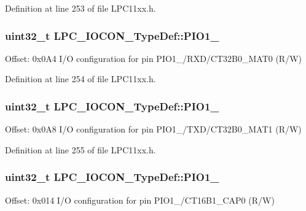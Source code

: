 Definition at line 253 of file L\+P\+C11xx.\+h.

\subsubsection[{\texorpdfstring{P\+I\+O1\+\_\+6}{PIO1_6}}]{ uint32\+\_\+t L\+P\+C\+\_\+\+I\+O\+C\+O\+N\+\_\+\+Type\+Def\+::\+P\+I\+O1\+\_}\hypertarget{group___l_p_c11xx___definitions_gab0d99b431267d587d8d31f11746ccfec}{}\label{group___l_p_c11xx___definitions_gab0d99b431267d587d8d31f11746ccfec}
Offset\+: 0x0\+A4 I/O configuration for pin P\+I\+O1\+\_/\+R\+X\+D/\+C\+T32\+B0\+\_\+\+M\+A\+T0 (R/W) 

Definition at line 254 of file L\+P\+C11xx.\+h.

\subsubsection[{\texorpdfstring{P\+I\+O1\+\_\+7}{PIO1_7}}]{ uint32\+\_\+t L\+P\+C\+\_\+\+I\+O\+C\+O\+N\+\_\+\+Type\+Def\+::\+P\+I\+O1\+\_}\hypertarget{group___l_p_c11xx___definitions_gad81e4c8b31f2bd3420aefa571cfeb08c}{}\label{group___l_p_c11xx___definitions_gad81e4c8b31f2bd3420aefa571cfeb08c}
Offset\+: 0x0\+A8 I/O configuration for pin P\+I\+O1\+\_/\+T\+X\+D/\+C\+T32\+B0\+\_\+\+M\+A\+T1 (R/W) 

Definition at line 255 of file L\+P\+C11xx.\+h.

\subsubsection[{\texorpdfstring{P\+I\+O1\+\_\+8}{PIO1_8}}]{ uint32\+\_\+t L\+P\+C\+\_\+\+I\+O\+C\+O\+N\+\_\+\+Type\+Def\+::\+P\+I\+O1\+\_}\hypertarget{group___l_p_c11xx___definitions_ga7b21ecfdd70f25fde6090d50447fba94}{}\label{group___l_p_c11xx___definitions_ga7b21ecfdd70f25fde6090d50447fba94}
Offset\+: 0x014 I/O configuration for pin P\+I\+O1\+\_/\+C\+T16\+B1\+\_\+\+C\+A\+P0 (R/W) 

